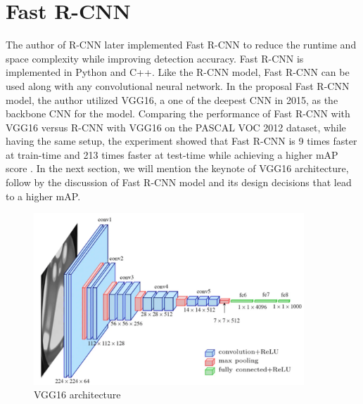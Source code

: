 \section{Fast R-CNN} \label{sec:fast_rcnn}

The author of R-CNN later implemented Fast R-CNN to reduce the runtime and space complexity while improving detection accuracy. Fast R-CNN is implemented in Python and C++. Like the R-CNN model, Fast R-CNN can be used along with any convolutional neural network. In the proposal Fast R-CNN model, the author utilized VGG16, a one of the deepest CNN in 2015, as the backbone CNN for the model. Comparing the performance of Fast R-CNN with VGG16 versus R-CNN with VGG16 on the PASCAL VOC 2012 dataset, while having the same setup, the experiment showed that Fast R-CNN is 9 times faster at train-time and 213 times faster at test-time while achieving a higher mAP score \cite{fast_rcnn_og}. In the next section, we will mention the keynote of VGG16 architecture, follow by the discussion of Fast R-CNN model and its design decisions that lead to a higher mAP.

\begin{figure}[!ht]
    \centering
    \includegraphics[width=4in]{figures/vgg16_architect.png}
    \caption{VGG16 architecture \cite{vgg16_architect_2014}}
    \label{fig:vgg16_archite}
\end{figure}

